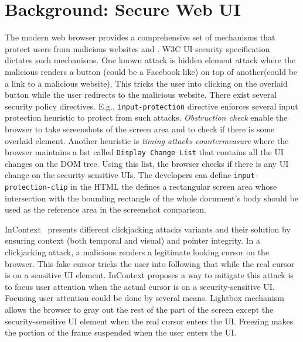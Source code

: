 \section{Background: Secure Web UI}
\label{sec:background}

The modern web browser provides a comprehensive set of mechanisms that protect users from malicious websites and \js. W3C UI security specification~\cite{w3c_spec} dictates such mechanisms. One known attack is hidden element attack where the malicious \js renders a button (could be a Facebook like) on top of another(could be a link to a malicious website). This tricks the user into clicking on the overlaid button while the user redirects to the malicious website. There exist several security policy directives. E.g., \texttt{input-protection} directive enforces several input protection heuristic to protect from such attacks.  \emph{Obstruction check} enable the browser to take screenshots of the screen area and to check if there is some overlaid element. Another heuristic is \emph{timing attacks countermeasure} where the browser maintains a list called \texttt{Display Change List} that contains all the UI changes on the DOM tree. Using this list, the browser checks if there is any UI change on the security sensitive UIs. The developers can define \texttt{input-protection-clip} in the HTML the defines a rectangular screen area whose intersection with the bounding rectangle of the whole document's body should be used as the reference area in the screenshot comparison.

InContext~\cite{huang2012clickjacking} presents different clickjacking attacks variants and their solution by ensuring context (both temporal and visual) and pointer integrity. In a clickjacking attack, a malicious \js renders a legitimate looking cursor on the browser. This fake cursor tricks the user into following that while the real cursor is on a sensitive UI element. InContext proposes a way to mitigate this attack is to focus user attention when the actual cursor is on a security-sensitive UI. Focusing user attention could be done by several means. Lightbox mechanism allows the browser to gray out the rest of the part of the screen except the security-sensitive UI element when the real cursor enters the UI. Freezing makes the portion of the frame suspended when the user enters the UI. %